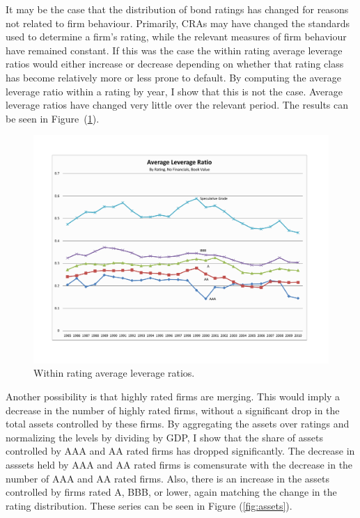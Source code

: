 \documentclass[titlepage]{article}
\begin{document}
It may be the case that the distribution of bond ratings has changed for reasons not related to firm behaviour. Primarily, CRAs may have changed the standards used to determine a firm's rating, while the relevant measures of firm behaviour have remained constant. If this was the case the within rating average leverage ratios would either increase or decrease depending on whether that rating class has become relatively more or less prone to default. By computing the average leverage ratio within a rating by year, I show that this is not the case. Average leverage ratios have changed very little over the relevant period. The results can be seen in Figure~(\ref{fig:avg_lev}). 

\begin{figure}[ht]
\centering
	\includegraphics[width=\textwidth]{avg_leverage_bv_nofin.pdf}
	\caption{Within rating average leverage ratios.}
	\label{fig:avg_lev}
\end{figure}

Another possibility is that highly rated firms are merging. This would imply a decrease in the number of highly rated firms, without a significant drop in the total assets controlled by these firms. By aggregating the assets over ratings and normalizing the levels by dividing by GDP, I show that the share of assets controlled by AAA and AA rated firms has dropped significantly. The decrease in asssets held by AAA and AA rated firms is comensurate with the decrease in the number of AAA and AA rated firms. Also, there is an increase in the assets controlled by firms rated A, BBB, or lower, again matching the change in the rating distribution. These series can be seen in Figure (\ref{fig:assets}). 
\end{document}
